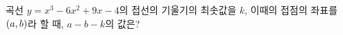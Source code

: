 곡선 $y=x^3-6x^2+9x-4$의 접선의 기울기의 최솟값을 $k$, 이때의 접점의 좌표를 $(a{,}\mkern3mu\mathopen{}b)$라 할 때, $a-b-k$의 값은?
